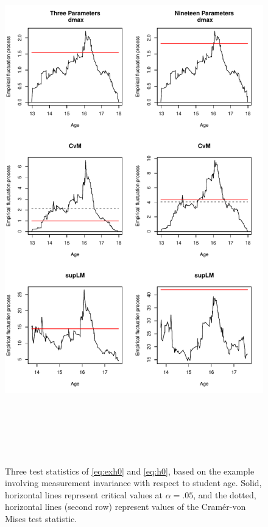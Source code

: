 \documentclass[man]{apa}
\begin{document}
\begin{figure}
\caption{Three test statistics of \eqref{eq:exh0} and \eqref{eq:h0}, 
  based on the example involving measurement invariance with respect
  to student age.  Solid, horizontal lines represent critical values
  at $\alpha=.05$, and the dotted, horizontal lines (second row)
  represent values of the Cram\'{e}r-von Mises test statistic.}
\label{fig:cusumex}
\includegraphics[height=9in]{gefp_3_19.pdf}
\end{figure}
\end{document}
